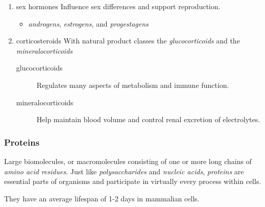 \documentclass[11pt]{article}
\begin{document}
\begin{enumerate}
\begin{enumerate}
\item sex hormones
\label{sec:orgc3c2194}
Influence sex differences and support reproduction. 

\begin{itemize}
\item \emph{androgens}, \emph{estrogens}, and \emph{progestagens}
\end{itemize}

\item corticosteroids
\label{sec:org0c969ff}
With natural product classes the \emph{glucocorticoids} and the
\emph{mineralocorticoids}

\begin{description}
\item[{glucocorticoids}] Regulates many aspects of metabolism and immune function.

\item[{mineralocorticoids}] Help maintain blood volume and control renal
excretion of electrolytes.
\end{description}
\end{enumerate}
\end{enumerate}

\subsubsection{Proteins}
\label{sec:org01ca357}
Large biomolecules, or macromolecules consisting of one or more long chains
of \emph{amino acid} \emph{residues}. Just like \emph{polysaccharides} and \emph{nucleic acids},
\emph{proteins} are essential parts of organisms and participate in virtually
every process within cells.

They have an average lifespan of 1-2 days in mammalian cells.
\end{document}

